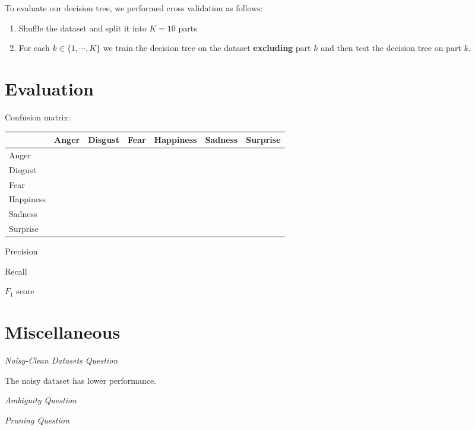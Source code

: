 \documentclass[12pt, a4paper, portrait]{article}
\begin{document}
To evaluate our decision tree, we performed cross validation as follows:
\begin{enumerate}
    \item Shuffle the dataset and split it into $K = 10$ parts
    \item For each $k \in \{1, \dotsm, K\}$ we train the decision tree on the dataset \textbf{excluding} part $k$ and then test the decision tree on part $k$.
\end{enumerate}

\section*{Evaluation}
Confusion matrix:
\begin{center}
\begin{tabular} { C{1.7cm} | C{1.5cm} C{1.5cm} C{1.3cm} C{1.7cm} C{1.5cm} C{1.5cm} }
    & Anger & Disgust & Fear & Happiness & Sadness & Surprise \\ \hline
    Anger     &   &   &   &   &   &   \\
    Disgust   &   &   &   &   &   &   \\
    Fear      &   &   &   &   &   &   \\
    Happiness &   &   &   &   &   &   \\
    Sadness   &   &   &   &   &   &   \\
    Surprise  &   &   &   &   &   &
\end{tabular}
\end{center}
Precision\par
Recall\par
$F_1$ score\par

\section*{Miscellaneous}

\textit{Noisy-Clean Datasets Question}\par
\bigskip
The noisy dataset has lower performance.\par
\bigskip

\textit{Ambiguity Question}\par
\bigskip

\textit{Pruning Question}\par
\bigskip
\end{document}
